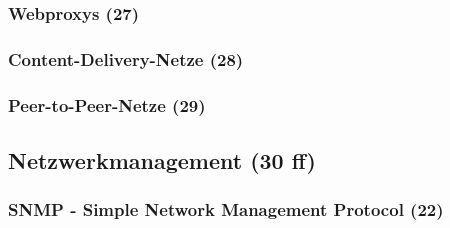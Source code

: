 \subsubsection{Webproxys (27)}
\subsubsection{Content-Delivery-Netze (28)}
\subsubsection{Peer-to-Peer-Netze (29)}
\subsection{Netzwerkmanagement (30 ff)}
\subsubsection{SNMP - Simple Network Management Protocol (22)}

